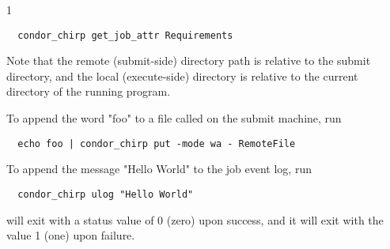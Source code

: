 \begin{ManPage}{\label{man-condor-chirp}}{1}
\footnotesize
\begin{verbatim}
  condor_chirp get_job_attr Requirements
\end{verbatim}
\normalsize

Note that the remote (submit-side) directory path is relative to the
submit directory, and the local (execute-side) directory is relative to the
current directory of the running program.

To append the word "foo" to a file called  
on the submit machine, run

\footnotesize
\begin{verbatim}
  echo foo | condor_chirp put -mode wa - RemoteFile
\end{verbatim}
\normalsize

To append the message "Hello World" to the job event log, run

\footnotesize
\begin{verbatim}
  condor_chirp ulog "Hello World"
\end{verbatim}
\normalsize

\ExitStatus

 will exit with a status value of 0 (zero) upon success,
and it will exit with the value 1 (one) upon failure.

\end{ManPage}
